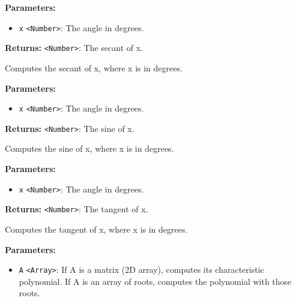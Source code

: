 \documentclass[12pt,a4paper]{article}
\begin{document}
\noindent \textbf{Parameters:}
\begin{itemize}
  \item \texttt{x} \texttt{<Number>}: The angle in degrees.
\end{itemize}

\noindent \textbf{Returns:} \texttt{<Number>}: The secant of x.

\noindent Computes the secant of x, where x is in degrees.

\vspace{5mm}
\noindent {}


\noindent \textbf{Parameters:}
\begin{itemize}
  \item \texttt{x} \texttt{<Number>}: The angle in degrees.
\end{itemize}

\noindent \textbf{Returns:} \texttt{<Number>}: The sine of x.

\noindent Computes the sine of x, where x is in degrees.

\vspace{5mm}
\noindent {}


\noindent \textbf{Parameters:}
\begin{itemize}
  \item \texttt{x} \texttt{<Number>}: The angle in degrees.
\end{itemize}

\noindent \textbf{Returns:} \texttt{<Number>}: The tangent of x.

\noindent Computes the tangent of x, where x is in degrees.

\vspace{5mm}
\noindent {}


\noindent \textbf{Parameters:}
\begin{itemize}
  \item \texttt{A} \texttt{<Array>}: If \textasciigrave{}A\textasciigrave{} is a matrix (2D array), computes its characteristic polynomial.
                   If \textasciigrave{}A\textasciigrave{} is an array of roots, computes the polynomial with those roots.
\end{itemize}
\end{document}
